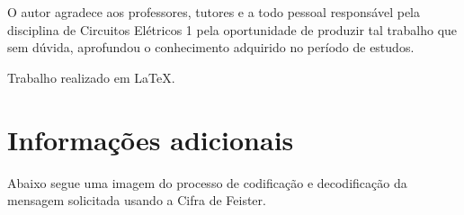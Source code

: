\documentclass[a4paper,pra,aps,twocolumn,superscriptaddress,10pt,final]{revtex4-2}
\begin{document}
    \begin{acknowledgments}
        O autor agradece aos professores, tutores e a todo pessoal responsável pela disciplina de Circuitos Elétricos 1 pela oportunidade de produzir tal trabalho que sem dúvida, aprofundou o conhecimento adquirido no período de estudos.    

        Trabalho realizado em \LaTeX.
    \end{acknowledgments}
% 


\appendix

\section{Informações adicionais}
\label{apx:data}

    Abaixo segue uma imagem do processo de codificação e decodificação da mensagem solicitada usando a Cifra de Feister.

\end{document}
